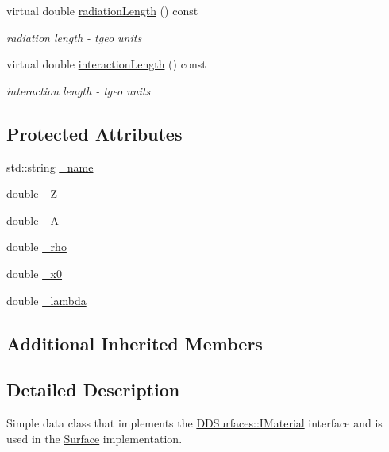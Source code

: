 \begin{DoxyCompactItemize}
virtual double \hyperlink{class_d_d4hep_1_1_d_d_rec_1_1_material_data_ae0160490acc99fb7b880f687c70f1ec8}{radiation\+Length} () const
\begin{DoxyCompactList}\small\item\em radiation length -\/ tgeo units \end{DoxyCompactList}\item 
virtual double \hyperlink{class_d_d4hep_1_1_d_d_rec_1_1_material_data_aa0b2daf7a34cc83b58192cd0aff4dbbe}{interaction\+Length} () const
\begin{DoxyCompactList}\small\item\em interaction length -\/ tgeo units \end{DoxyCompactList}\end{DoxyCompactItemize}
\subsection*{Protected Attributes}
\begin{DoxyCompactItemize}
\item 
std\+::string \hyperlink{class_d_d4hep_1_1_d_d_rec_1_1_material_data_aec3008cab8825e1aa3813043ebafb77a}{\+\_\+name}
\item 
double \hyperlink{class_d_d4hep_1_1_d_d_rec_1_1_material_data_acf48e4405aaa58e1255d41e49c0c956a}{\+\_\+Z}
\item 
double \hyperlink{class_d_d4hep_1_1_d_d_rec_1_1_material_data_a0f26dcc4953ef81b56673d32a3cdd66c}{\+\_\+A}
\item 
double \hyperlink{class_d_d4hep_1_1_d_d_rec_1_1_material_data_a9589f3b1eeba21a241b7d17e469705a1}{\+\_\+rho}
\item 
double \hyperlink{class_d_d4hep_1_1_d_d_rec_1_1_material_data_a187ecb221422fa7e4451cce49480cdca}{\+\_\+x0}
\item 
double \hyperlink{class_d_d4hep_1_1_d_d_rec_1_1_material_data_a7917025516bbbdaa104c86d6e95ddb28}{\+\_\+lambda}
\end{DoxyCompactItemize}
\subsection*{Additional Inherited Members}


\subsection{Detailed Description}
Simple data class that implements the \hyperlink{class_d_d_surfaces_1_1_i_material}{D\+D\+Surfaces\+::\+I\+Material} interface and is used in the \hyperlink{class_d_d4hep_1_1_d_d_rec_1_1_surface}{Surface} implementation.

